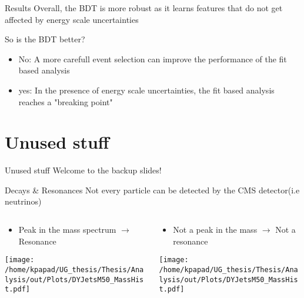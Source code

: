 \documentclass[bigger]{beamer}
\begin{document}
\begin{frame}[label={sec:org638f0f5}]{Results}
Overall, the BDT is more robust as it learns features that do not get affected by energy scale uncertainties\newline

\alert{So is the BDT better?}
\begin{itemize}
\item No: A more carefull event selection can improve the performance of the fit based analysis
\item yes: In the presence of energy scale uncertainties, the fit based analysis reaches a "breaking point"
\end{itemize}
\end{frame}

\section{Unused stuff}
\label{sec:orgaa26e59}
\begin{frame}[label={sec:org6443461}]{Unused stuff}
\alert{Welcome to the backup slides!}
\end{frame}

\begin{frame}[label={sec:orgd1ccb4a}]{Decays \& Resonances}
Not every particle can be detected by the CMS detector(i.e neutrinos)
\begin{columns}
\begin{column}{0.5\columnwidth}
\begin{itemize}
\item Peak in the mass spectrum \(\rightarrow\) Resonance
\end{itemize}
\begin{center}
\texttt{[image: /home/kpapad/UG\_thesis/Thesis/Analysis/out/Plots/DYJetsM50\_MassHist.pdf]}
\end{center}
\end{column}

\begin{column}{0.5\columnwidth}
\begin{itemize}
\item Not a peak in the mass \(\rightarrow\) Not a resonance
\end{itemize}
\begin{center}
\texttt{[image: /home/kpapad/UG\_thesis/Thesis/Analysis/out/Plots/DYJetsM50\_MassHist.pdf]}
\end{center}
\end{column}
\end{columns}
\end{frame}
\end{document}
